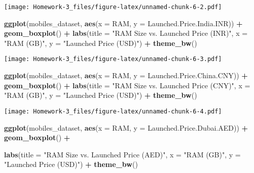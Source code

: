 \documentclass[
]{article}
\newenvironment{Shaded}{\begin{snugshade}}{\end{snugshade}}
\newcommand{\AttributeTok}[1]{\textcolor[rgb]{0.13,0.29,0.53}{#1}}
\newcommand{\FunctionTok}[1]{\textcolor[rgb]{0.13,0.29,0.53}{\textbf{#1}}}
\newcommand{\NormalTok}[1]{#1}
\newcommand{\SpecialCharTok}[1]{\textcolor[rgb]{0.81,0.36,0.00}{\textbf{#1}}}
\newcommand{\StringTok}[1]{\textcolor[rgb]{0.31,0.60,0.02}{#1}}
\begin{document}
\texttt{[image: Homework-3\_files/figure-latex/unnamed-chunk-6-2.pdf]}

\begin{Shaded}
\begin{Highlighting}[]
\FunctionTok{ggplot}\NormalTok{(mobiles\_dataset, }\FunctionTok{aes}\NormalTok{(}\AttributeTok{x =}\NormalTok{ RAM, }\AttributeTok{y =}\NormalTok{ Launched.Price.India.INR)) }\SpecialCharTok{+}
  \FunctionTok{geom\_boxplot}\NormalTok{() }\SpecialCharTok{+}
  \FunctionTok{labs}\NormalTok{(}\AttributeTok{title =} \StringTok{"RAM Size vs. Launched Price (INR)"}\NormalTok{,}
       \AttributeTok{x =} \StringTok{"RAM (GB)"}\NormalTok{,}
       \AttributeTok{y =} \StringTok{"Launched Price (USD)"}\NormalTok{) }\SpecialCharTok{+}
  \FunctionTok{theme\_bw}\NormalTok{()}
\end{Highlighting}
\end{Shaded}

\texttt{[image: Homework-3\_files/figure-latex/unnamed-chunk-6-3.pdf]}

\begin{Shaded}
\begin{Highlighting}[]
\FunctionTok{ggplot}\NormalTok{(mobiles\_dataset, }\FunctionTok{aes}\NormalTok{(}\AttributeTok{x =}\NormalTok{ RAM, }\AttributeTok{y =}\NormalTok{ Launched.Price.China.CNY)) }\SpecialCharTok{+}
  \FunctionTok{geom\_boxplot}\NormalTok{() }\SpecialCharTok{+}
  \FunctionTok{labs}\NormalTok{(}\AttributeTok{title =} \StringTok{"RAM Size vs. Launched Price (CNY)"}\NormalTok{,}
       \AttributeTok{x =} \StringTok{"RAM (GB)"}\NormalTok{,}
       \AttributeTok{y =} \StringTok{"Launched Price (USD)"}\NormalTok{) }\SpecialCharTok{+}
  \FunctionTok{theme\_bw}\NormalTok{()}
\end{Highlighting}
\end{Shaded}

\texttt{[image: Homework-3\_files/figure-latex/unnamed-chunk-6-4.pdf]}

\begin{Shaded}
\begin{Highlighting}[]
\FunctionTok{ggplot}\NormalTok{(mobiles\_dataset, }\FunctionTok{aes}\NormalTok{(}\AttributeTok{x =}\NormalTok{ RAM, }\AttributeTok{y =}\NormalTok{ Launched.Price.Dubai.AED)) }\SpecialCharTok{+}
  \FunctionTok{geom\_boxplot}\NormalTok{() }\SpecialCharTok{+}
  
  \FunctionTok{labs}\NormalTok{(}\AttributeTok{title =} \StringTok{"RAM Size vs. Launched Price (AED)"}\NormalTok{,}
       \AttributeTok{x =} \StringTok{"RAM (GB)"}\NormalTok{,}
       \AttributeTok{y =} \StringTok{"Launched Price (USD)"}\NormalTok{) }\SpecialCharTok{+}
  \FunctionTok{theme\_bw}\NormalTok{()}
\end{Highlighting}
\end{Shaded}
\end{document}
